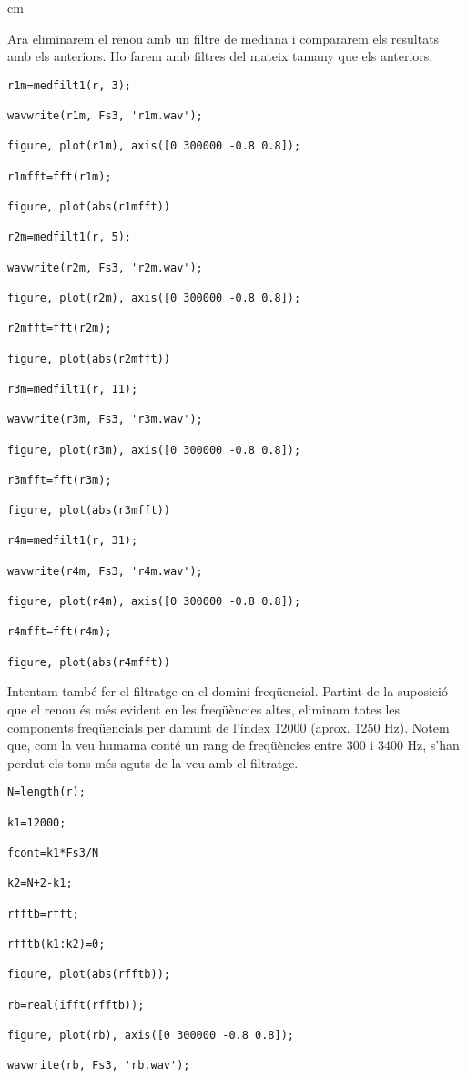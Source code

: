 \documentclass{article}
\begin{document}
 cm

Ara eliminarem el renou amb un filtre de mediana i compararem els resultats amb els anteriors.
Ho farem amb filtres del mateix tamany que els anteriors.

\begin{verbatim}
r1m=medfilt1(r, 3);

wavwrite(r1m, Fs3, 'r1m.wav');

figure, plot(r1m), axis([0 300000 -0.8 0.8]);

r1mfft=fft(r1m);

figure, plot(abs(r1mfft))

r2m=medfilt1(r, 5);

wavwrite(r2m, Fs3, 'r2m.wav');

figure, plot(r2m), axis([0 300000 -0.8 0.8]);

r2mfft=fft(r2m);

figure, plot(abs(r2mfft))

r3m=medfilt1(r, 11);

wavwrite(r3m, Fs3, 'r3m.wav');

figure, plot(r3m), axis([0 300000 -0.8 0.8]);

r3mfft=fft(r3m);

figure, plot(abs(r3mfft))

r4m=medfilt1(r, 31);

wavwrite(r4m, Fs3, 'r4m.wav');

figure, plot(r4m), axis([0 300000 -0.8 0.8]);

r4mfft=fft(r4m);

figure, plot(abs(r4mfft))
\end{verbatim}

Intentam també fer el filtratge en el domini freqüencial. Partint de la suposició que el renou és més evident en
les freqüències altes, eliminam totes les components freqüencials per damunt de l'índex 12000 (aprox. 1250 Hz).
Notem que, com la veu humama conté un rang de freqüències entre 300 i 3400 Hz, s'han perdut els tons més aguts
de la veu amb el filtratge.

\begin{verbatim}
N=length(r);

k1=12000;

fcont=k1*Fs3/N

k2=N+2-k1;

rfftb=rfft;

rfftb(k1:k2)=0;

figure, plot(abs(rfftb));

rb=real(ifft(rfftb));

figure, plot(rb), axis([0 300000 -0.8 0.8]);

wavwrite(rb, Fs3, 'rb.wav');
\end{verbatim}
\end{document}
